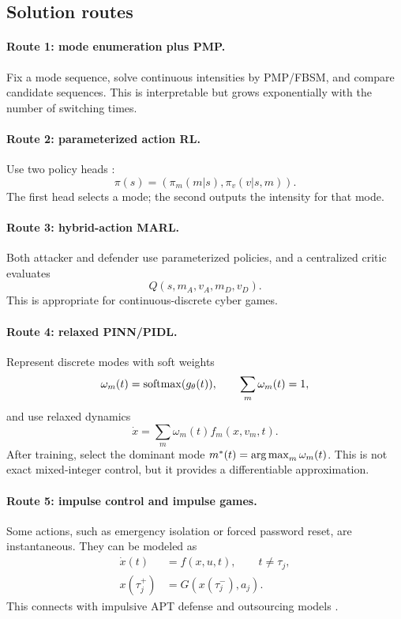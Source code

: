 \documentclass[11pt,a4paper]{article}
\begin{document}
\subsection{Solution routes}
\paragraph{Route 1: mode enumeration plus PMP.}
Fix a mode sequence, solve continuous intensities by PMP/FBSM, and compare candidate sequences. This is interpretable but grows exponentially with the number of switching times.

\paragraph{Route 2: parameterized action RL.}
Use two policy heads \cite{hausknecht2015}:
\begin{equation}
\pi(s)=\left(\pi_m(m|s),\pi_v(v|s,m)\right).
\end{equation}
The first head selects a mode; the second outputs the intensity for that mode.

\paragraph{Route 3: hybrid-action MARL.}
Both attacker and defender use parameterized policies, and a centralized critic evaluates
\begin{equation}
Q(s,m_A,v_A,m_D,v_D).
\end{equation}
This is appropriate for continuous-discrete cyber games.

\paragraph{Route 4: relaxed PINN/PIDL.}
Represent discrete modes with soft weights
\begin{equation}
\omega_m(t)=\operatorname{softmax}(g_\theta(t)),\qquad \sum_m\omega_m(t)=1,
\end{equation}
and use relaxed dynamics
\begin{equation}
\dot{x}=\sum_m\omega_m(t)f_m(x,v_m,t).
\end{equation}
After training, select the dominant mode $m^*(t)=\operatorname*{arg\,max}_m\omega_m(t)$. This is not exact mixed-integer control, but it provides a differentiable approximation.

\paragraph{Route 5: impulse control and impulse games.}
Some actions, such as emergency isolation or forced password reset, are instantaneous. They can be modeled as
\begin{align}
\dot{x}(t)&=f(x,u,t),\qquad t\neq\tau_j,\\
x(\tau_j^+)&=G(x(\tau_j^-),a_j).
\end{align}
This connects with impulsive APT defense and outsourcing models \cite{sun2023impulsive,qin2024impulsive}.
\end{document}
